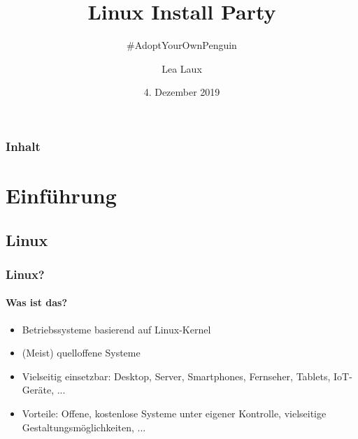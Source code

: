 \documentclass[9pt]{beamer}
\title{Linux Install Party}
\subtitle{\#AdoptYourOwnPenguin}
\author{Lea Laux}
\institute{Fachschaft Informatik Mathematik}
\date{4. Dezember 2019}
\begin{document}
\titlepage

\begin{frame}
 \frametitle{Inhalt}
 \tableofcontents
\end{frame}

\section{Einführung}
\subsection{Linux} 
\begin{frame}
 \frametitle{Linux?}
 \framesubtitle{Was ist das?}
	\begin{Large}
		\begin{itemize}
			\item Betriebssysteme basierend auf Linux-Kernel
	 		\item (Meist) quelloffene Systeme
	 		\item Vielseitig einsetzbar: Desktop, Server, Smartphones, Fernseher, Tablets, IoT-Geräte, ...
	 		\item Vorteile: Offene, kostenlose Systeme unter eigener Kontrolle, vielseitige Gestaltungsmöglichkeiten, ...
 		\end{itemize}
	\end{Large}
\end{frame}
\end{document}
